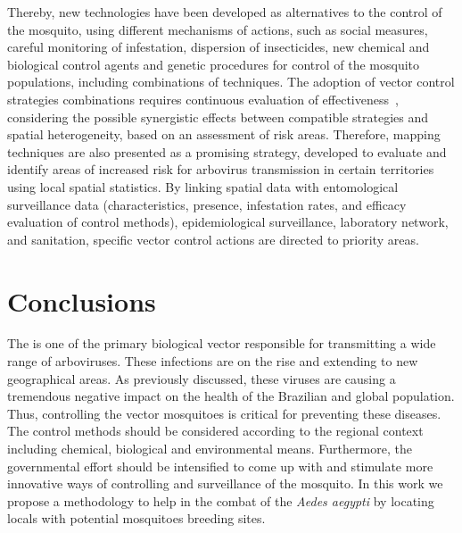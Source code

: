 Thereby, new technologies have been developed as alternatives to the control of the mosquito, using different mechanisms of actions, such as social measures, careful monitoring of infestation, dispersion of insecticides, new chemical and biological control agents and genetic procedures for control of the mosquito populations, including combinations of techniques.
The adoption of vector control strategies combinations requires continuous evaluation of effectiveness~\cite{araujo2015aedes}, considering the possible synergistic effects between compatible strategies and spatial heterogeneity, based on an assessment of risk areas.
Therefore, mapping techniques are also presented as a promising strategy, developed to evaluate and identify areas of increased risk for arbovirus transmission in certain territories using local spatial statistics.
By linking spatial data with entomological surveillance data (characteristics, presence, infestation rates, and efficacy evaluation of control methods), epidemiological surveillance, laboratory network, and sanitation, specific vector control actions are directed to priority areas.

\section{Conclusions}
%
The \Aedes is one of the primary biological vector responsible for transmitting a wide range of arboviruses.
These infections are on the rise and extending to new geographical areas.
As previously discussed, these viruses are causing a tremendous negative impact on the health of the Brazilian and global population.
Thus, controlling the vector mosquitoes is critical for preventing these diseases.
The control methods should be considered according to the regional context including chemical, biological and environmental means.
Furthermore, the governmental effort should be intensified to come up with and stimulate more innovative ways of controlling and surveillance of the mosquito.
In this work we propose a methodology to help in the combat of the {\it Aedes aegypti} by locating locals with potential mosquitoes breeding sites.






